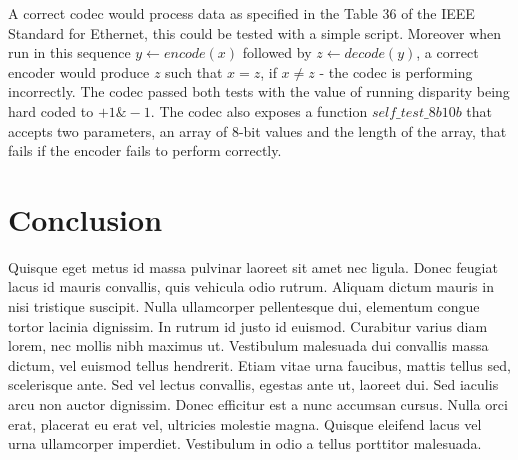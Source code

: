 \documentclass[conference]{IEEEtran}
\begin{document}
A correct codec would process data as specified in the Table 36 of the IEEE Standard for Ethernet\cite{ieeestandard}, this could be tested with a simple script. Moreover when run in this sequence $y\leftarrow encode(x)$ followed by $z\leftarrow decode(y)$, a correct encoder would produce $z$ such that $x=z$, if $x\neq z$ - the codec is performing incorrectly. The codec passed both tests with the value of running disparity being hard coded to $+1 \& -1$. The codec also exposes a function $self\_test\_8b10b$ that accepts two parameters, an array of 8-bit values and the length of the array, that fails if the encoder fails to perform correctly.

\section{Conclusion}

Quisque eget metus id massa pulvinar laoreet sit amet nec ligula. Donec feugiat lacus id mauris convallis, quis vehicula odio rutrum. Aliquam dictum mauris in nisi tristique suscipit. Nulla ullamcorper pellentesque dui, elementum congue tortor lacinia dignissim. In rutrum id justo id euismod. Curabitur varius diam lorem, nec mollis nibh maximus ut. Vestibulum malesuada dui convallis massa dictum, vel euismod tellus hendrerit. Etiam vitae urna faucibus, mattis tellus sed, scelerisque ante. Sed vel lectus convallis, egestas ante ut, laoreet dui. Sed iaculis arcu non auctor dignissim. Donec efficitur est a nunc accumsan cursus. Nulla orci erat, placerat eu erat vel, ultricies molestie magna. Quisque eleifend lacus vel urna ullamcorper imperdiet. Vestibulum in odio a tellus porttitor malesuada.



\end{document}
